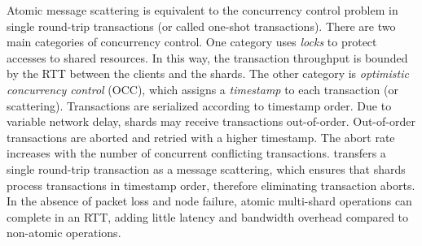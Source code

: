 Atomic message scattering is equivalent to the concurrency control problem in single round-trip transactions (or called one-shot transactions). There are two main categories of concurrency control. One category uses \textit{locks} to protect accesses to shared resources. In this way, the transaction throughput is bounded by the RTT between the clients and the shards. The other category is \textit{optimistic concurrency control} (OCC), which assigns a \textit{timestamp} to each transaction (or scattering). Transactions are serialized according to timestamp order. Due to variable network delay, shards may receive transactions out-of-order. Out-of-order transactions are aborted and retried with a higher timestamp. The abort rate increases with the number of concurrent conflicting transactions. \sys transfers a single round-trip transaction as a message scattering, which ensures that shards process transactions in timestamp order, therefore eliminating transaction aborts. In the absence of packet loss and node failure, atomic multi-shard operations can complete in an RTT, adding little latency and bandwidth overhead compared to non-atomic operations.




